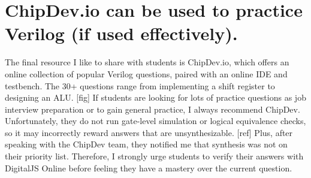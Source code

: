 \section{ChipDev.io can be used to practice Verilog (if used effectively).}

The final resource I like to share with students is ChipDev.io, which offers an online collection of popular Verilog questions, paired with an online IDE and testbench. The 30+ questions range from implementing a shift register to designing an ALU. [fig] If students are looking for lots of practice questions as job interview preparation or to gain general practice, I always recommend ChipDev. Unfortunately, they do not run gate-level simulation or logical equivalence checks, so it may incorrectly reward answers that are unsynthesizable. [ref] Plus, after speaking with the ChipDev team, they notified me that synthesis was not on their priority list. Therefore, I strongly urge students to verify their answers with DigitalJS Online before feeling they have a mastery over the current question.
